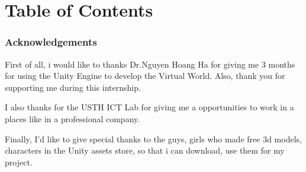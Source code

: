 \documentclass[a4paper, 13pt]{extarticle}
\begin{document}
\part*{\Large Table of Contents}

\newpage

\newpage
\section*{\color{cyan}\Large Acknowledgements}

First of all, i would like to thanks Dr.Nguyen Hoang Ha for giving me 3 months for using the Unity Engine to develop the Virtual World. Also, thank you for supporting me during this internship. 

I also thanks for the USTH ICT Lab for giving me a opportunities to work in a places like in a professional company. 

Finally, I'd like to give special thanks to the guys, girls who made free 3d models, characters in the Unity assets store, so that i can download, use them for my project.
\newpage
 
 \newpage
 \appendix
  \renewcommand{\thesubsection}{\Alph{section}}
 \renewcommand{\thesubsection}{\arabic{subsection}}
\end{document}
